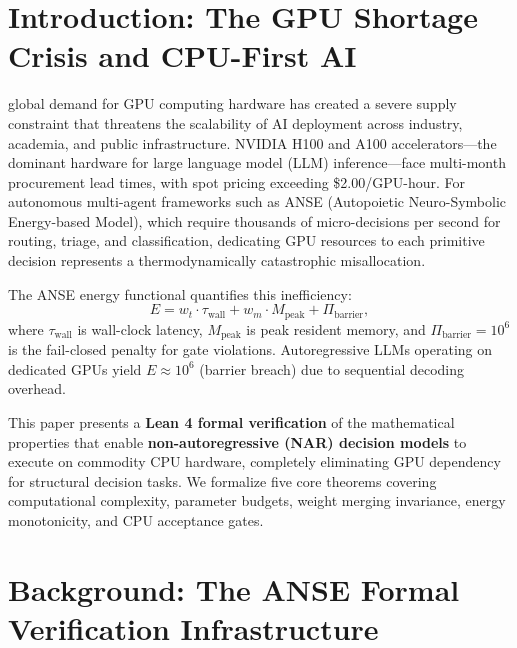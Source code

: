\documentclass[10pt,journal,compsoc]{IEEEtran}
\theoremstyle{remark}
\begin{document}
\maketitle
\IEEEdisplaynontitleabstractindextext
\IEEEpeerreviewmaketitle

\section{Introduction: The GPU Shortage Crisis and CPU-First AI}
 global demand for GPU computing hardware has created a severe supply constraint that threatens the scalability of AI deployment across industry, academia, and public infrastructure. NVIDIA H100 and A100 accelerators---the dominant hardware for large language model (LLM) inference---face multi-month procurement lead times, with spot pricing exceeding \$2.00/GPU-hour. For autonomous multi-agent frameworks such as ANSE (Autopoietic Neuro-Symbolic Energy-based Model), which require thousands of micro-decisions per second for routing, triage, and classification, dedicating GPU resources to each primitive decision represents a thermodynamically catastrophic misallocation.

The ANSE energy functional quantifies this inefficiency:
\begin{equation}
E = w_t \cdot \tau_{\text{wall}} + w_m \cdot M_{\text{peak}} + \Pi_{\text{barrier}},
\label{eq:anse_energy}
\end{equation}
where $\tau_{\text{wall}}$ is wall-clock latency, $M_{\text{peak}}$ is peak resident memory, and $\Pi_{\text{barrier}} = 10^6$ is the fail-closed penalty for gate violations. Autoregressive LLMs operating on dedicated GPUs yield $E \approx 10^6$ (barrier breach) due to sequential decoding overhead.

This paper presents a \textbf{Lean 4 formal verification} of the mathematical properties that enable \textbf{non-autoregressive (NAR) decision models} to execute on commodity CPU hardware, completely eliminating GPU dependency for structural decision tasks. We formalize five core theorems covering computational complexity, parameter budgets, weight merging invariance, energy monotonicity, and CPU acceptance gates.

\section{Background: The ANSE Formal Verification Infrastructure}
\end{document}
